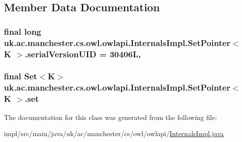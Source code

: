 \subsection{Member Data Documentation}
\hypertarget{classuk_1_1ac_1_1manchester_1_1cs_1_1owl_1_1owlapi_1_1_internals_impl_1_1_set_pointer_3_01_k_01_4_a0127a8c5a5b7cde1030cacad91784c28}{
\subsubsection[{serial\-Version\-U\-I\-D}]{\setlength{\rightskip}{0pt plus 5cm}final long uk.\-ac.\-manchester.\-cs.\-owl.\-owlapi.\-Internals\-Impl.\-Set\-Pointer$<$ K $>$.serial\-Version\-U\-I\-D = 30406\-L\hspace{0.3cm}{\ttfamily [static]}, {\ttfamily [private]}}}\label{classuk_1_1ac_1_1manchester_1_1cs_1_1owl_1_1owlapi_1_1_internals_impl_1_1_set_pointer_3_01_k_01_4_a0127a8c5a5b7cde1030cacad91784c28}
\hypertarget{classuk_1_1ac_1_1manchester_1_1cs_1_1owl_1_1owlapi_1_1_internals_impl_1_1_set_pointer_3_01_k_01_4_a87fff0dae37c328814bc2b1a169d9706}{
\subsubsection[{set}]{\setlength{\rightskip}{0pt plus 5cm}final Set$<$K$>$ uk.\-ac.\-manchester.\-cs.\-owl.\-owlapi.\-Internals\-Impl.\-Set\-Pointer$<$ K $>$.set\hspace{0.3cm}{\ttfamily [private]}}}\label{classuk_1_1ac_1_1manchester_1_1cs_1_1owl_1_1owlapi_1_1_internals_impl_1_1_set_pointer_3_01_k_01_4_a87fff0dae37c328814bc2b1a169d9706}


The documentation for this class was generated from the following file\-:\begin{DoxyCompactItemize}
\item 
impl/src/main/java/uk/ac/manchester/cs/owl/owlapi/\hyperlink{_internals_impl_8java}{Internals\-Impl.\-java}\end{DoxyCompactItemize}
